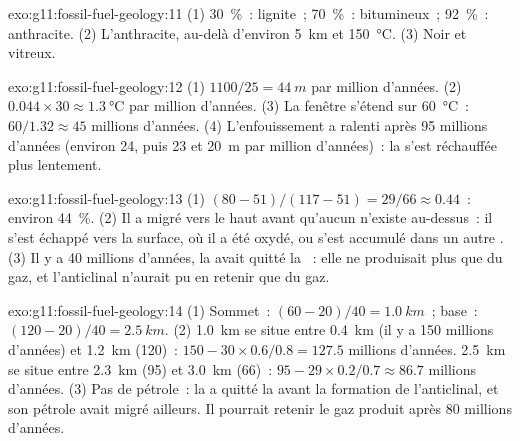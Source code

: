 \begin{solution}{exo:g11:fossil-fuel-geology:11}
(1) \qty{30}{\percent}~: lignite~; \qty{70}{\percent}~: 
bitumineux~; \qty{92}{\percent}~: anthracite. (2) L'anthracite, au-delà
d'environ \qty{5}{km} et \qty{150}{\degreeCelsius}. (3) Noir et vitreux.
\end{solution}

\begin{solution}{exo:g11:fossil-fuel-geology:12}
(1) $1100/25 = \qty{44}{m}$ par million d'années. (2) $0.044 \times 30
\approx \qty{1.3}{\degreeCelsius}$ par million d'années. (3) La fenêtre
s'étend sur \qty{60}{\degreeCelsius}~: $60/1.32 \approx 45$ millions
d'années. (4) L'enfouissement a ralenti après 95 millions d'années (environ
24, puis 23 et \qty{20}{m} par million d'années)~: la  s'est
réchauffée plus lentement.
\end{solution}

\begin{solution}{exo:g11:fossil-fuel-geology:13}
(1) $(80 - 51)/(117 - 51) = 29/66 \approx 0.44$~: environ
\qty{44}{\percent}. (2) Il a migré vers le haut avant qu'aucun 
n'existe au-dessus~: il s'est échappé vers la surface, où il a été oxydé, ou
s'est accumulé dans un autre . (3) Il y a 40 millions d'années, la
 avait quitté la ~: elle ne produisait plus que du
gaz, et l'anticlinal n'aurait pu en retenir que du gaz.
\end{solution}

\begin{solution}{exo:g11:fossil-fuel-geology:14}
(1) Sommet~: $(60 - 20)/40 = \qty{1.0}{km}$~; base~: $(120 - 20)/40 =
\qty{2.5}{km}$. (2) \qty{1.0}{km} se situe entre \qty{0.4}{km} (il y a 150
millions d'années) et \qty{1.2}{km} (120)~: $150 - 30 \times 0.6/0.8 = 127.5$ millions d'années. \qty{2.5}{km} se situe entre \qty{2.3}{km} (95)
et \qty{3.0}{km} (66)~: $95 - 29 \times 0.2/0.7 \approx 86.7$ millions
d'années. (3) Pas de pétrole~: la  a quitté la 
avant la formation de l'anticlinal, et son pétrole avait migré ailleurs.
Il pourrait retenir le gaz produit après 80 millions d'années.
\end{solution}

